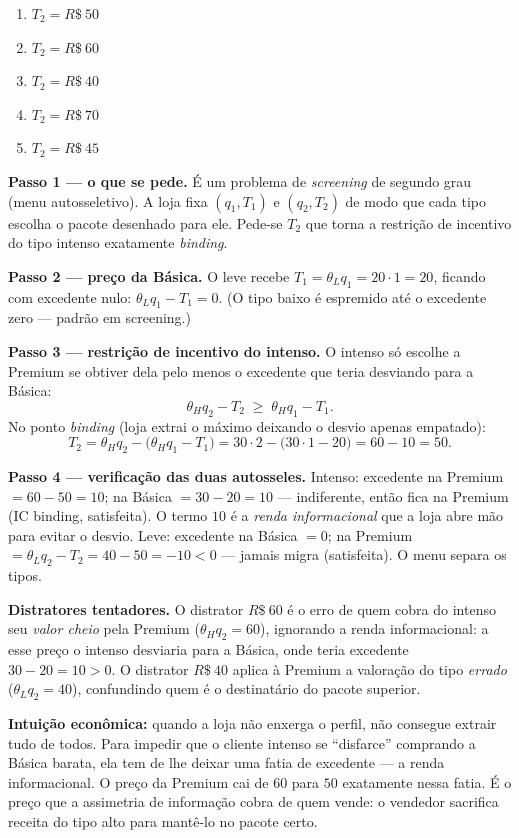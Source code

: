 \begin{enumerate}[label=\Alph*., leftmargin=3.2em, itemsep=0.05em, topsep=0.1em]
  \item $T_2=R\$~50$
  \item $T_2=R\$~60$
  \item $T_2=R\$~40$
  \item $T_2=R\$~70$
  \item $T_2=R\$~45$
\end{enumerate}
\begin{solucao}
\textbf{Passo 1 --- o que se pede.} \'E um problema de \emph{screening} de segundo grau (menu autosseletivo). A loja fixa $(q_1,T_1)$ e $(q_2,T_2)$ de modo que cada tipo escolha o pacote desenhado para ele. Pede-se $T_2$ que torna a restri\c{c}\~ao de incentivo do tipo intenso exatamente \emph{binding}.

\textbf{Passo 2 --- pre\c{c}o da B\'asica.} O leve recebe $T_1=\theta_L q_1=20\cdot 1=20$, ficando com excedente nulo: $\theta_L q_1-T_1=0$. (O tipo baixo \'e espremido at\'e o excedente zero --- padr\~ao em screening.)

\textbf{Passo 3 --- restri\c{c}\~ao de incentivo do intenso.} O intenso s\'o escolhe a Premium se obtiver dela pelo menos o excedente que teria desviando para a B\'asica:
\[
\theta_H q_2-T_2\;\ge\;\theta_H q_1-T_1.
\]
No ponto \emph{binding} (loja extrai o m\'aximo deixando o desvio apenas empatado):
\[
T_2=\theta_H q_2-\big(\theta_H q_1-T_1\big)=30\cdot 2-\big(30\cdot 1-20\big)=60-10=50.
\]

\textbf{Passo 4 --- verifica\c{c}\~ao das duas autosseles.} Intenso: excedente na Premium $=60-50=10$; na B\'asica $=30-20=10$ --- indiferente, ent\~ao fica na Premium (IC binding, satisfeita). O termo $10$ \'e a \emph{renda informacional} que a loja abre m\~ao para evitar o desvio. Leve: excedente na B\'asica $=0$; na Premium $=\theta_L q_2-T_2=40-50=-10<0$ --- jamais migra (satisfeita). O menu separa os tipos.

\textbf{Distratores tentadores.} O distrator $R\$~60$ \'e o erro de quem cobra do intenso seu \emph{valor cheio} pela Premium ($\theta_H q_2=60$), ignorando a renda informacional: a esse pre\c{c}o o intenso desviaria para a B\'asica, onde teria excedente $30-20=10>0$. O distrator $R\$~40$ aplica \`a Premium a valora\c{c}\~ao do tipo \emph{errado} ($\theta_L q_2=40$), confundindo quem \'e o destinat\'ario do pacote superior.

\textbf{Intui\c{c}\~ao econ\^omica:} quando a loja n\~ao enxerga o perfil, n\~ao consegue extrair tudo de todos. Para impedir que o cliente intenso se ``disfarce'' comprando a B\'asica barata, ela tem de lhe deixar uma fatia de excedente --- a renda informacional. O pre\c{c}o da Premium cai de $60$ para $50$ exatamente nessa fatia. \'E o pre\c{c}o que a assimetria de informa\c{c}\~ao cobra de quem vende: o vendedor sacrifica receita do tipo alto para mant\^e-lo no pacote certo.
\end{solucao}

